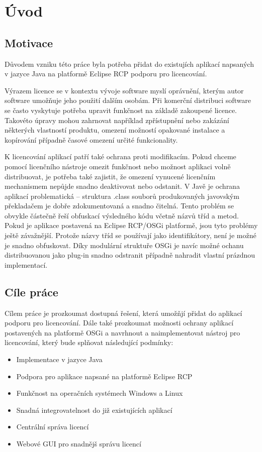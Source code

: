 \chapter{Úvod}

\section{Motivace}

Důvodem vzniku této práce byla potřeba přidat do existujích aplikací napsaných
v jazyce Java na platformě Eclipse RCP podporu pro licencování.

Výrazem licence se v kontextu vývoje software myslí oprávnění, kterým autor
software umožňuje jeho použití dalším osobám. Při komerční distribuci software
se často vyskytuje potřeba upravit funkčnost na základě zakoupené licence.
Takovéto úpravy mohou zahrnovat například zpřístupnění nebo zakázání některých
vlastností produktu, omezení možností opakované instalace a kopírování případně
časové omezení určité funkcionality.

K licencování aplikací patří také ochrana proti modifikacím. Pokud chceme
pomocí licenčního nástroje omezit funkčnost nebo možnost aplikaci volně
distribuovat, je potřeba také zajistit, že omezení vynucené licenčním
mechanismem nepůjde snadno deaktivovat nebo odstanit. V Javě je ochrana aplikací
problematická – struktura .class souborů produkovaných javovským překladačem je
dobře zdokumentovaná a snadno čitelná\cite{vmspec}. Tento problém se obvykle částečně
řeší obfuskací výsledného kódu včetně názvů tříd a metod. Pokud je aplikace postavená
na Eclipse RCP/OSGi platformě, jsou tyto problémy ještě závažnější. Protože
názvy tříd se používají jako identifikátory, není je možné je snadno obfuskovat.
Díky modulární struktuře OSGi je navíc možné ochanu distribuovanou jako plug-in
snadno odstranit případně nahradit vlastní prázdnou implementací.
	
\section{Cíle práce}
Cílem práce je prozkoumat dostupná řešení, která umožňjí přidat do aplikací
podporu pro licencování. Dále také prozkoumat možnosti ochrany aplikací
postavených na platformě OSGi a navrhnout a naimplementovat nástroj pro
licencování, který bude splňovat následující podmínky:
\begin{itemize}
  \item Implementace v jazyce Java
  \item Podpora pro aplikace napsané na platformě Eclipse RCP
  \item Funkčnost na operačních systémech Windows a Linux
  \item Snadná integrovatelnost do již existujících aplikací
  \item Centrální správa licencí
  \item Webové GUI pro snadnějš správu licencí
\end{itemize}
